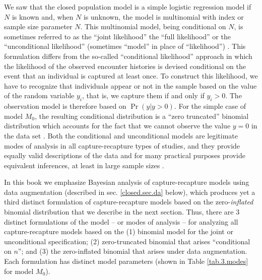 
We saw that the closed population model is a simple logistic
regression model if $N$ is known and, when $N$ is unknown, the model
is multinomial with index or sample size parameter $N$. This
multinomial model, being conditional on $N$, is sometimes referred to
as the ``joint likelihood'' the ``full likelihood'' or the
``unconditional likelihood'' (sometimes
``model'' in place of ``likelihood'')
\citep{sanathanan:1972,borchers_etal:2002}. This
formulation differs from the so-called ``conditional likelihood''
approach in which the likelihood of the observed encounter histories
is devised conditional on the event that an individual is captured at
least once.  To construct this likelihood, we have to recognize that
individuals appear or not in the sample based on the value of the
random variable $y_{i}$, that is, we capture them if and only if
$y_{i}>0$.  The observation model is therefore based on $\Pr(y|y>0)$.
For the simple case of model $M_0$, the resulting conditional
distribution is a ``zero truncated'' binomial distribution which
accounts for the fact that we cannot observe the value $y=0$ in the
data set \citep[see][sec. 5.1]{royle_dorazio:2008}.  Both the
conditional and unconditional models are legitimate modes of analysis
in all capture-recapture types of studies, and they provide equally
valid descriptions of the data and for many practical purposes provide
equivalent inferences, at least in large sample sizes
\citep{sanathanan:1972}.

In this book we emphasize Bayesian analysis of capture-recapture
models using data augmentation
(described in sec. \ref{closed.sec.da} below), which
produces yet a third distinct formulation of capture-recapture models
based on the zero-{\it inflated} binomial distribution that we
describe in the next section.  Thus, there are 3 distinct formulations
of the model -- or modes of analysis -- for analyzing all
capture-recapture models based on the (1) binomial model for the joint
or unconditional specification; (2) zero-truncated binomial that
arises ``conditional on $n$''; and (3) the zero-inflated binomial that
arises under data augmentation.  Each formulation has distinct
model parameters (shown in Table \ref{tab.3.modes} for
model $M_0$).


